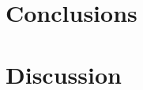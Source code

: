 \documentclass[english]{tktltiki2}
\begin{document}
\section{Conclusions}



\section{Discussion}




\pagebreak

%
%
% 
%




\lastpage
\end{document}
